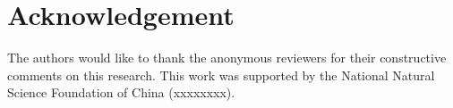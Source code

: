 \documentclass[runningheads]{llncs}
\begin{document}










\section{Acknowledgement}
The authors would like to thank the anonymous reviewers for their constructive comments on this research. This work was supported by the National Natural Science Foundation of China (xxxxxxxx).
%
%
%
% 
% 


\end{document}
